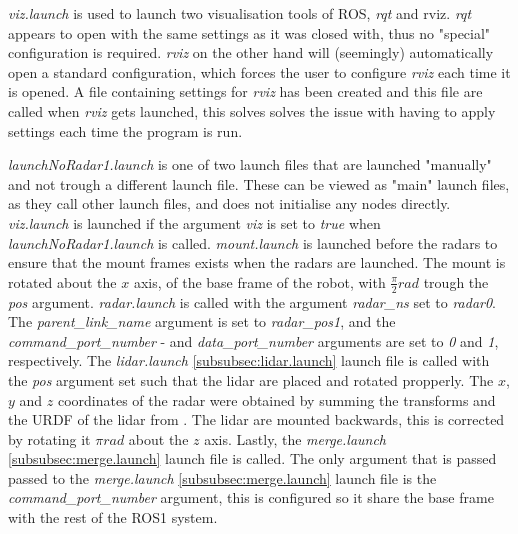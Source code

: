\textit{viz.launch} is used to launch two visualisation tools of ROS, \textit{rqt} and {rviz}. \textit{rqt} appears to open with the same settings as it was closed with, thus no "special" configuration is required. \textit{rviz} on the other hand will (seemingly) automatically open a standard configuration, which forces the user to configure \textit{rviz} each time it is opened. A file containing settings for \textit{rviz} has been created and this file are called when \textit{rviz} gets launched, this solves solves the issue with having to apply settings each time the program is run.

\label{subsubsec:launchNoRadar1.launch}
\textit{launchNoRadar1.launch} is one of two launch files that are launched "manually" and not trough a different launch file. These can be viewed as "main" launch files, as they call other launch files, and does not initialise any nodes directly. \textit{viz.launch} is launched if the argument \textit{viz} is set to \textit{true} when \textit{launchNoRadar1.launch} is called. \textit{mount.launch} is launched before the radars to ensure that the mount frames exists when the radars are launched. The mount is rotated about the $x$ axis, of the base frame of the robot, with $\frac{\pi}{2} rad$ trough the \textit{pos} argument. \textit{radar.launch} \label{subsubsec:radar.launch} is called with the argument \textit{radar\_ns} set to \textit{radar0}. The \textit{parent\_link\_name} argument is set to \textit{radar\_pos1}, and the \textit{command\_port\_number} - and \textit{data\_port\_number} arguments are set to \textit{0} and \textit{1}, respectively. The \textit{lidar.launch} \ref{subsubsec:lidar.launch} launch file is called with the \textit{pos} argument set such that the lidar are placed and rotated propperly. The $x$, $y$ and $z$ coordinates of the radar were obtained by summing the transforms and the URDF of the lidar from \cite{uia_husky_0776}. The lidar are mounted backwards, this is corrected by rotating it $\pi rad$ about the $z$ axis. Lastly, the \textit{merge.launch} \ref{subsubsec:merge.launch} launch file is called. The only argument that is passed passed to the \textit{merge.launch} \ref{subsubsec:merge.launch} launch file is the \textit{command\_port\_number} argument, this is configured so it share the base frame with the rest of the ROS1 system.

